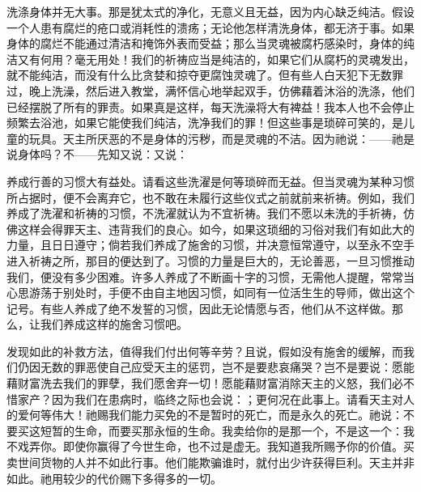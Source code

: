 洗涤身体并无大事。那是犹太式的净化，无意义且无益，因为内心缺乏纯洁。假设一个人患有腐烂的疮口或消耗性的溃疡；无论他怎样清洗身体，都无济于事。如果身体的腐烂不能通过清洁和掩饰外表而受益；那么当灵魂被腐朽感染时，身体的纯洁又有何用？毫无用处！我们的祈祷应当是纯洁的，如果它们从腐朽的灵魂发出，就不能纯洁，而没有什么比贪婪和掠夺更腐蚀灵魂了。但有些人白天犯下无数罪过，晚上洗澡，然后进入教堂，满怀信心地举起双手，仿佛藉着沐浴的洗涤，他们已经摆脱了所有的罪责。如果真是这样，每天洗澡将大有裨益！我本人也不会停止频繁去浴池，如果它能使我们纯洁，洗净我们的罪！但这些事是琐碎可笑的，是儿童的玩具。天主所厌恶的不是身体的污秽，而是灵魂的不洁。因为祂说：——祂是说身体吗？不——先知又说：又说：\par

养成行善的习惯大有益处。请看这些洗濯是何等琐碎而无益。但当灵魂为某种习惯所占据时，便不会离弃它，也不敢在未履行这些仪式之前就前来祈祷。例如，我们养成了洗濯和祈祷的习惯，不洗濯就认为不宜祈祷。我们不愿以未洗的手祈祷，仿佛这样会得罪天主、违背我们的良心。如今，如果这琐细的习俗对我们有如此大的力量，且日日遵守；倘若我们养成了施舍的习惯，并决意恒常遵守，以至永不空手进入祈祷之所，那目的便达到了。习惯的力量是巨大的，无论善恶，一旦习惯推动我们，便没有多少困难。许多人养成了不断画十字的习惯，无需他人提醒，常常当心思游荡于别处时，手便不由自主地因习惯，如同有一位活生生的导师，做出这个记号。有些人养成了绝不发誓的习惯，因此无论情愿与否，他们从不这样做。那么，让我们养成这样的施舍习惯吧。\par

发现如此的补救方法，值得我们付出何等辛劳？且说，假如没有施舍的缓解，而我们仍因无数的罪恶使自己应受天主的惩罚，岂不是要悲哀痛哭？岂不是要说：愿能藉财富洗去我们的罪孽，我们愿舍弃一切！愿能藉财富消除天主的义怒，我们必不惜家产？因为我们在患病时，临终之际也会说：；更何况在此事上。请看天主对人的爱何等伟大！祂赐我们能力买免的不是暂时的死亡，而是永久的死亡。祂说：不要买这短暂的生命，而要买那永恒的生命。我卖给你的是那一个，不是这一个：我不戏弄你。即使你赢得了今世生命，也不过是虚无。我知道我所赐予你的价值。买卖世间货物的人并不如此行事。他们能欺骗谁时，就付出少许获得巨利。天主并非如此。祂用较少的代价赐下多得多的一切。\par

